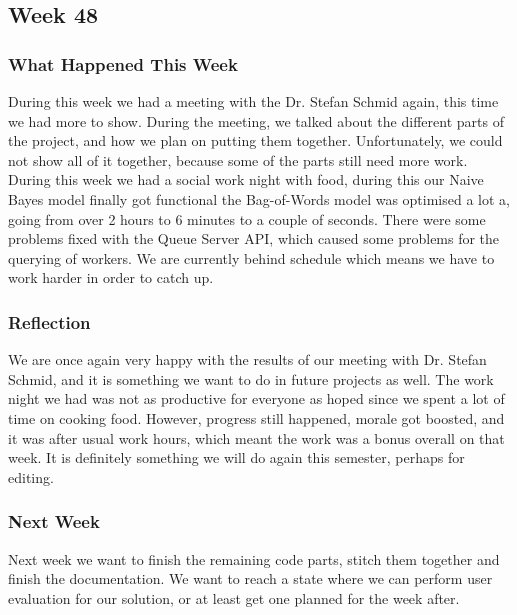 \subsection{Week 48} 
\subsubsection{What Happened This Week}
During this week we had a meeting with the Dr. Stefan Schmid again, this time
we had more to show. During the meeting, we talked about the different parts of the
project, and how we plan on putting them together. Unfortunately, we could not
show all of it together, because some of the parts still need more work.
During this week we had a social work night with food, during this our Naive
Bayes model finally got functional the Bag-of-Words model was optimised a lot a,
going from over 2 hours to 6 minutes to a couple of seconds. There were some
problems fixed with the Queue Server \ac{API}, which caused some problems for
the querying of workers. We are currently behind schedule which means we have to
work harder in order to catch up.

\subsubsection{Reflection}
We are once again very happy with the results of our meeting with Dr. Stefan
Schmid, and it is something we want to do in future projects as well. The work
night we had was not as productive for everyone as hoped since we spent a
lot of time on cooking food. However, progress still happened, morale got
boosted, and it was after usual work hours, which meant the work was a
bonus overall on that week. It is definitely something we will do again this
semester, perhaps for editing. 

\subsubsection{Next Week}
Next week we want to finish the remaining code parts, stitch them together and
finish the documentation. We want to reach a state where we can perform user
evaluation for our solution, or at least get one planned for the week after.


